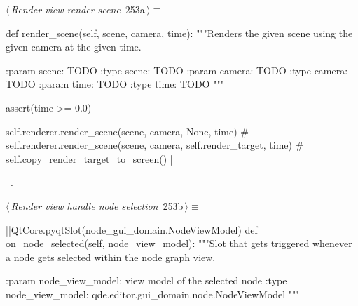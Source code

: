 \documentclass[%
    a4paper,    %
    justified,  %
    nobib,      %
    openany     %
]{tufte-book}
\makeatletter
\renewcommand{\label}[1]{\@tufte@label{##1}}%
\makeatother
\begin{document}
\begin{fullwidth}
\begin{flushleft}
\begin{minipage}{\linewidth}
\begin{list}{}{\setlength{\itemsep}{-\parsep}\setlength{\itemindent}{-\leftmargin}}
\item{}
\end{list}
\end{minipage}\vspace{4ex}
\end{flushleft}
\begin{flushleft} \small
\begin{minipage}{\linewidth}\label{scrap278}\raggedright\small
{} $\langle\,${\itshape Render view render scene}\nobreak\ {\footnotesize {253a}}$\,\rangle\equiv$
\vspace{-1ex}
\begin{pythoncode}
def render_scene(self, scene, camera, time):
    """Renders the given scene using the given camera at the given time.

    :param scene: TODO
    :type scene: TODO
    :param camera: TODO
    :type camera: TODO
    :param time: TODO
    :type time: TODO
    """

    assert(time >= 0.0)

    self.renderer.render_scene(scene, camera, None, time)
    # self.renderer.render_scene(scene, camera, self.render_target, time)
    # self.copy_render_target_to_screen()
|\NWsep|
\end{pythoncode}
\vspace{1.5ex}
\footnotesize
\begin{list}{}{\setlength{\itemsep}{-\parsep}\setlength{\itemindent}{-\leftmargin}}
\item \NWtxtMacroRefIn\ .

\item{}
\end{list}
\end{minipage}\vspace{4ex}
\end{flushleft}
\begin{flushleft} \small
\begin{minipage}{\linewidth}\label{scrap279}\raggedright\small
{} $\langle\,${\itshape Render view handle node selection}\nobreak\ {\footnotesize {253b}}$\,\rangle\equiv$
\vspace{-1ex}
\begin{pythoncode}
|\normalfont{}\fontfamily{}|QtCore.pyqtSlot(node_gui_domain.NodeViewModel)
def on_node_selected(self, node_view_model):
    """Slot that gets triggered whenever a node gets selected within the
    node graph view.

    :param node_view_model: view model of the selected node
    :type  node_view_model: qde.editor.gui_domain.node.NodeViewModel
    """


\end{pythoncode}
\end{minipage}
\end{flushleft}
\end{fullwidth}
\end{document}
